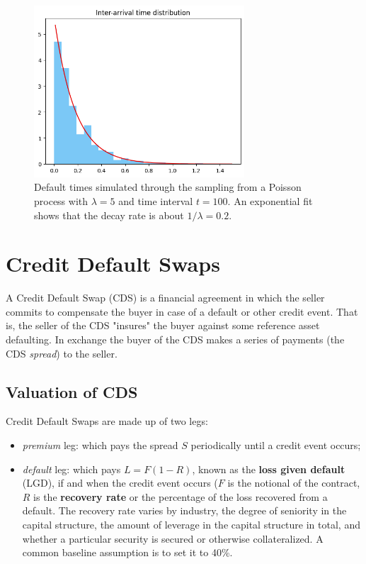 \begin{figure}[htb]
	\centering
	\includegraphics[width=0.7\textwidth]{figures/default_time_simulation}
	\caption{Default times simulated through the sampling from a Poisson process with $\lambda=5$ and time interval $t=100$. An exponential fit shows that the decay rate is about $1/\lambda=0.2$.}
	\label{fig:default_time_simulation}
\end{figure}

\section{Credit Default Swaps}
\label{sec:credit-default-swaps}


A Credit Default Swap (CDS) is a financial agreement in which the seller commits to compensate the buyer in case of a default or other credit event. That is, the seller of the CDS "insures" the buyer against some reference asset defaulting. In exchange the buyer of the CDS makes a series of payments (the CDS \emph{spread}) to the seller.

\subsection{Valuation of CDS}
\label{sec:cds_valuation}

Credit Default Swaps are made up of two legs:

\begin{itemize}
\tightlist
\item \emph{premium} leg: which pays the spread $S$ periodically until a credit event occurs;
\item \emph{default} leg: which pays $L = F(1 - R)$, known as the \textbf{loss given default} (LGD), if and when the credit event occurs ($F$ is the notional of the contract, $R$ is the \textbf{recovery rate} or the percentage of the loss recovered from a default. The recovery rate varies by industry, the degree of seniority in the capital structure, the amount of leverage in the capital structure in total, and whether a particular security is secured or otherwise collateralized. A common baseline assumption is to set it to 40\%.
\end{itemize}

